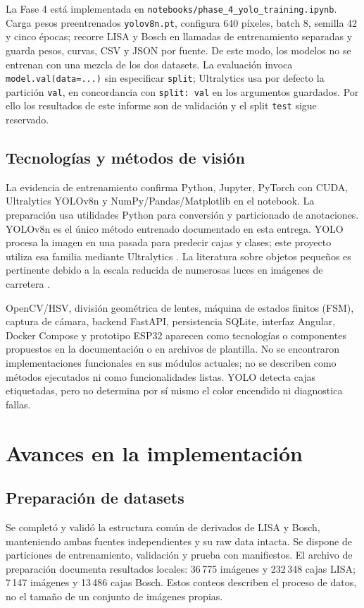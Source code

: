 \documentclass[conference]{IEEEtran}
\begin{document}
La Fase 4 está implementada en \texttt{notebooks/phase\_4\_yolo\_training.ipynb}. Carga pesos preentrenados \texttt{yolov8n.pt}, configura 640 píxeles, batch 8, semilla 42 y cinco épocas; recorre LISA y Bosch en llamadas de entrenamiento separadas y guarda pesos, curvas, CSV y JSON por fuente. De este modo, los modelos no se entrenan con una mezcla de los dos datasets. La evaluación invoca \texttt{model.val(data=...)} sin especificar \texttt{split}; Ultralytics usa por defecto la partición \texttt{val}, en concordancia con \texttt{split: val} en los argumentos guardados. Por ello los resultados de este informe son de validación y el split \texttt{test} sigue reservado.

\subsection{Tecnologías y métodos de visión}
La evidencia de entrenamiento confirma Python, Jupyter, PyTorch con CUDA, Ultralytics YOLOv8n y NumPy/Pandas/Matplotlib en el notebook. La preparación usa utilidades Python para conversión y particionado de anotaciones. YOLOv8n es el único método entrenado documentado en esta entrega. YOLO procesa la imagen en una pasada para predecir cajas y clases; este proyecto utiliza esa familia mediante Ultralytics \cite{redmon2016,jocher2023}. La literatura sobre objetos pequeños es pertinente debido a la escala reducida de numerosas luces en imágenes de carretera \cite{behrendt2017,lee2019,chuang2023}.

OpenCV/HSV, división geométrica de lentes, máquina de estados finitos (FSM), captura de cámara, backend FastAPI, persistencia SQLite, interfaz Angular, Docker Compose y prototipo ESP32 aparecen como tecnologías o componentes propuestos en la documentación o en archivos de plantilla. No se encontraron implementaciones funcionales en sus módulos actuales; no se describen como métodos ejecutados ni como funcionalidades listas. YOLO detecta cajas etiquetadas, pero no determina por sí mismo el color encendido ni diagnostica fallas.

\section{Avances en la implementación}
\subsection{Preparación de datasets}
Se completó y validó la estructura común de derivados de LISA y Bosch, manteniendo ambas fuentes independientes y su raw data intacta. Se dispone de particiones de entrenamiento, validación y prueba con manifiestos. El archivo de preparación documenta resultados locales: 36\,775 imágenes y 232\,348 cajas LISA; 7\,147 imágenes y 13\,486 cajas Bosch. Estos conteos describen el proceso de datos, no el tamaño de un conjunto de imágenes propias.
\end{document}
